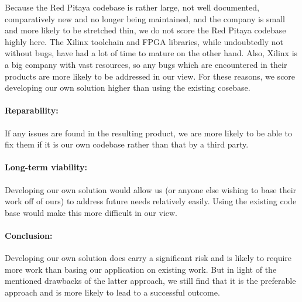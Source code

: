 Because  the  Red  Pitaya  codebase  is rather  large,  not  well  documented,
comparatively new and no longer being maintained, and the company is small and
more likely  to be  stretched thin, we  do not score  the Red  Pitaya codebase
highly here. The  Xilinx toolchain and  FPGA libraries, while  undoubtedly not
without bugs,  have had  a lot  of time to  mature on  the other  hand.  Also,
Xilinx is a big company with vast resources, so any bugs which are encountered
in  their products  are more  likely to  be addressed  in our  view. For these
reasons, we score  developing our own solution higher than  using the existing
cosebase.

\paragraph{Reparability:} If any issues are found in the resulting product, we
are more likely to  be able to fix them if it is  our own codebase rather than
that by a third party.

\paragraph{Long-term viability:} Developing  our own  solution would  allow us
(or anyone  else wishing  to base their  work off of  ours) to  address future
needs relatively  easily. Using the  existing code base  would make  this more
difficult in our view.

\paragraph{Conclusion:} Developing our  own solution does carry  a significant
risk  and is  likely  to require  more  work than  basing  our application  on
existing  work.   But in  light  of  the  mentioned  drawbacks of  the  latter
approach, we still find that it is  the preferable approach and is more likely
to lead to a successful outcome.


